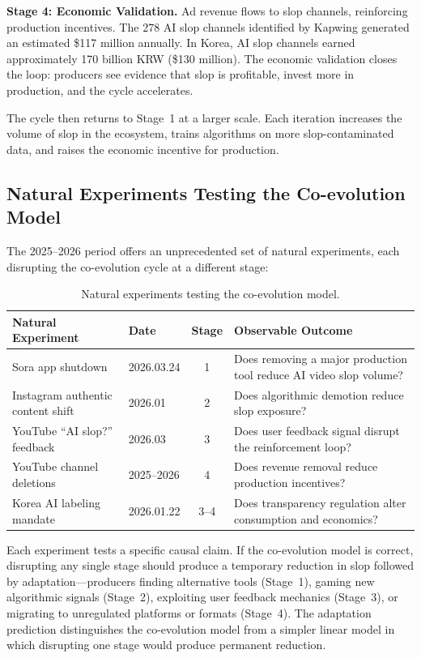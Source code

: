 \documentclass[12pt,a4paper]{article}
\begin{document}
\textbf{Stage 4: Economic Validation.} Ad revenue flows to slop channels, reinforcing production incentives. The 278 AI slop channels identified by Kapwing generated an estimated \$117 million annually. In Korea, AI slop channels earned approximately 170 billion KRW (\$130 million). The economic validation closes the loop: producers see evidence that slop is profitable, invest more in production, and the cycle accelerates.

The cycle then returns to Stage~1 at a larger scale. Each iteration increases the volume of slop in the ecosystem, trains algorithms on more slop-contaminated data, and raises the economic incentive for production.

\subsection{Natural Experiments Testing the Co-evolution Model}

The 2025--2026 period offers an unprecedented set of natural experiments, each disrupting the co-evolution cycle at a different stage:

\begin{table}[H]
\centering
\caption{Natural experiments testing the co-evolution model.}
\label{tab:experiments}
\small
\begin{tabularx}{\textwidth}{@{}l l c X @{}}
\toprule
\textbf{Natural Experiment} & \textbf{Date} & \textbf{Stage} & \textbf{Observable Outcome} \\
\midrule
Sora app shutdown & 2026.03.24 & 1 & Does removing a major production tool reduce AI video slop volume? \\
Instagram authentic content shift & 2026.01 & 2 & Does algorithmic demotion reduce slop exposure? \\
YouTube ``AI slop?'' feedback & 2026.03 & 3 & Does user feedback signal disrupt the reinforcement loop? \\
YouTube channel deletions & 2025--2026 & 4 & Does revenue removal reduce production incentives? \\
Korea AI labeling mandate & 2026.01.22 & 3--4 & Does transparency regulation alter consumption and economics? \\
\bottomrule
\end{tabularx}
\end{table}

Each experiment tests a specific causal claim. If the co-evolution model is correct, disrupting any single stage should produce a temporary reduction in slop followed by adaptation---producers finding alternative tools (Stage~1), gaming new algorithmic signals (Stage~2), exploiting user feedback mechanics (Stage~3), or migrating to unregulated platforms or formats (Stage~4). The adaptation prediction distinguishes the co-evolution model from a simpler linear model in which disrupting one stage would produce permanent reduction.
\end{document}
